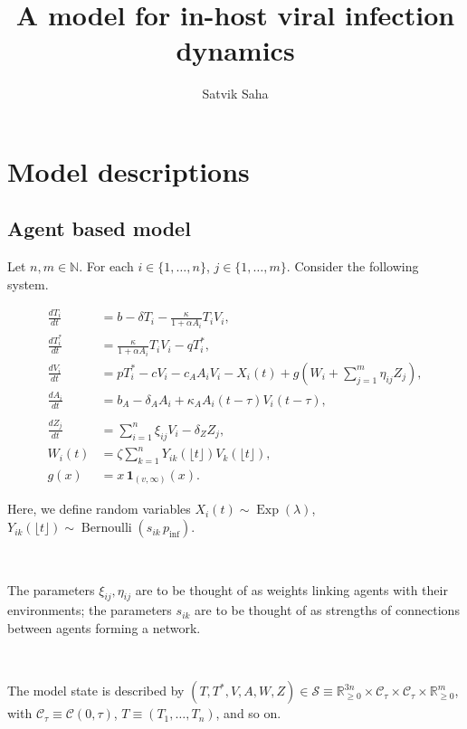 \documentclass[11pt]{article}
\title{A model for in-host viral infection dynamics}
\author{Satvik Saha}
\date{}
\begin{document}
    \maketitle

    \section{Model descriptions}

    \subsection{Agent based model}

    Let $n, m \in \mathbb{N}$. For each $i \in \{1, \dots, n\}$, $j \in \{1,
    \dots, m\}$. Consider the following system.

    \begin{align}
        \frac{dT_i}{dt} &= b -  \delta T_i - \frac{\kappa}{1 + \alpha A_i} T_iV_i, \\
        \frac{dT^*_i}{dt} &= \frac{\kappa}{1 + \alpha A_i} T_iV_i - qT^*_i, \\
        \frac{dV_i}{dt} &= pT^*_i - cV_i - c_A A_iV_i - X_i(t) + g\left(W_i + \sum_{j = 1}^m \eta_{ij} Z_j\right), \\
        \frac{dA_i}{dt} &= b_A -  \delta_A A_i + \kappa_A A_i(t - \tau)V_i(t - \tau), \\\\
        \frac{dZ_j}{dt} &= \sum_{i = 1}^n \xi_{ij} V_i - \delta_Z Z_j, \\
        W_i(t) &= \zeta \sum_{k = 1}^n Y_{ik}(\lfloor t\rfloor) V_k(\lfloor t\rfloor), \\
        g(x) &= x\, \mathbf{1}_{(v, \infty)}(x).
    \end{align}

    Here, we define random variables $X_i(t) \sim
    \operatorname{Exp}(\lambda)$, $Y_{ik}(\lfloor t\rfloor) \sim
    \operatorname{Bernoulli}(s_{ik} \, p_\text{inf})$.

    ~

    The parameters $\xi_{ij}, \eta_{ij}$ are to be thought of as weights
    linking agents with their environments; the parameters $s_{ik}$ are to be
    thought of as strengths of connections between agents forming a network.

    ~

    The model state is described by $(T, T^*, V, A, W, Z) \in \mathcal{S}
    \equiv \mathbb{R}_{\geq 0}^{3n} \times \mathcal{C}_\tau \times
    \mathcal{C}_\tau \times \mathbb{R}_{\geq 0}^{m}$, with $\mathcal{C}_\tau
    \equiv \mathcal{C}(0, \tau)$, $T \equiv (T_1, \dots, T_n)$, and so on.
\end{document}
